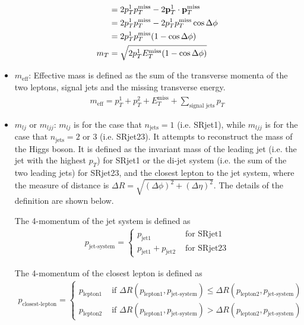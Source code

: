 \begin{itemize}
\begin{align}
&= 2 p_T^1 p_T^{\text{miss}} - 2 {\bf p}_T^1  \cdot {\bf p}_T^{\text{miss}} \\
&= 2 p_T^1 p_T^{\text{miss}} - 2 p_T^1 p_T^{\text{miss}} \cos{\Delta\phi} \\
&= 2 p_T^1 p_T^{\text{miss}} ( 1 - \cos{\Delta\phi} ) \\
m_T &= \sqrt{ 2 p_T^1 E_T^{\text{miss}} ( 1 - \cos{\Delta\phi} ) } \label{equ:mT_approx}
\end{align}
\item $m_{\text{eff}}$:
Effective mass is defined as the sum of the transverse momenta of the two leptons, signal jets and the missing transverse energy.
\begin{align}
m_{\text{eff}} = p_T^1 + p_T^2 + E_T^{\text{miss}} + \sum_{\text {signal jets}} p_T
\end{align}
\item $m_{lj}$ or $m_{ljj}$:
$m_{lj}$ is for the case that $n_{\text{jets}} = 1$ (i.e. SRjet1), while $m_{ljj}$ is for the case that $n_{\text{jets}} = 2$ or $3$ (i.e. SRjet23).
It attempts to reconstruct the mass of the Higgs boson.
It is defined as the invariant mass of the leading jet (i.e. the jet with the highest $p_T$) for SRjet1 or the di-jet system (i.e. the sum of the two leading jets) for SRjet23, and the closest lepton to the jet system, where the measure of distance is $\Delta R = \sqrt{(\Delta\phi)^2 + (\Delta\eta)^2}$.
The details of the definition are shown below.

The 4-momentum of the jet system is defined as
\begin{align}
p_{\text{jet-system}} =
\left\{
\begin{array}{ll}
p_{\text{jet1}} &\text{ for SRjet1}\\
p_{\text{jet1}} + p_{\text{jet2}} &\text{ for SRjet23}
\end{array} \right.
\end{align}

The 4-momentum of the closest lepton is defined as
\begin{align}
p_{\text{closest-lepton}} =
\left\{
\begin{array}{ll}
p_{\text{lepton1}} &\text{ if } \Delta R(p_{\text{lepton1}},p_{\text{jet-system}}) \leq \Delta R(p_{\text{lepton2}},p_{\text{jet-system}}) \\
p_{\text{lepton2}} &\text{ if } \Delta R(p_{\text{lepton1}},p_{\text{jet-system}}) > \Delta R(p_{\text{lepton2}},p_{\text{jet-system}})
\end{array} \right.
\end{align}


\end{itemize}
